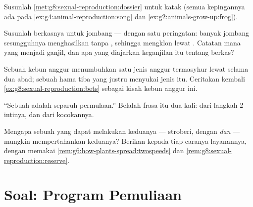 \begin{exercise}[$\star\star$]\label{exo:g8:sexual-reproduction:8}
Susunlah \cref{met:g8:sexual-reproduction:dossier} untuk katak (semua
kepingannya ada pada
\cref{ex:g4:animal-reproduction:song} dan
\cref{ex:g2:animals-grow-up:frog}).
\end{exercise}

\begin{exercise}[$\star\star$]\label{exo:g8:sexual-reproduction:9}
Susunlah berkasnya untuk jombang --- dengan satu peringatan: banyak
jombang sesungguhnya menghasilkan  tanpa , sehingga
mengklon lewat . Catatan mana yang menjadi ganjil, dan apa yang
diajarkan keganjilan itu tentang berkas?
\end{exercise}

\begin{exercise}[$\star\star$]\label{exo:g8:sexual-reproduction:10}
Sebuah kebun anggur menumbuhkan satu jenis anggur termasyhur lewat
 selama dua abad; sebuah hama tiba yang justru menyukai jenis itu.
Ceritakan kembali \cref{ex:g8:sexual-reproduction:bets} sebagai kisah
kebun anggur ini.
\end{exercise}

\begin{exercise}[$\star\star$]\label{exo:g8:sexual-reproduction:11}
``Sebuah  adalah separuh permulaan.'' Belalah frasa itu dua kali:
dari langkah 2 intinya, dan dari kocokannya.
\end{exercise}

\begin{exercise}[$\star\star\star$]\label{exo:g8:sexual-reproduction:12}
Mengapa sebuah  yang dapat melakukan keduanya --- stroberi,
dengan  \emph{dan}  --- mungkin mempertahankan keduanya?
Berikan kepada tiap caranya layanannya, dengan memakai
\cref{rem:g6:how-plants-spread:twospeeds} dan
\cref{rem:g8:sexual-reproduction:reserve}.
\end{exercise}

\section{Soal: Program Pemuliaan}

